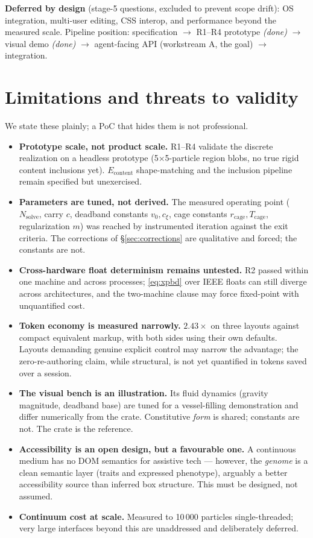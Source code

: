 \documentclass[11pt]{article}
\begin{document}
\medskip
\noindent\textbf{Deferred by design} (stage-5 questions, excluded to prevent scope drift):
OS integration, multi-user editing, CSS interop, and performance beyond the measured scale.
Pipeline position: specification $\rightarrow$ R1--R4 prototype \emph{(done)} $\rightarrow$
visual demo \emph{(done)} $\rightarrow$ agent-facing API (workstream A, the goal) $\rightarrow$
integration.

\section{Limitations and threats to validity}\label{sec:limits}

We state these plainly; a PoC that hides them is not professional.
\begin{itemize}[leftmargin=1.4em]
  \item \textbf{Prototype scale, not product scale.} R1--R4 validate the discrete realization on
  a headless prototype (5$\times$5-particle region blobs, no true rigid content inclusions yet).
  $E_{\text{content}}$ shape-matching and the inclusion pipeline remain specified but unexercised.
  \item \textbf{Parameters are tuned, not derived.} The measured operating point ($N_{\text{solve}}$,
  carry $c$, deadband constants $v_0, c_\xi$, cage constants $r_{\text{cage}}, T_{\text{cage}}$,
  regularization $m$) was reached by instrumented iteration against the exit criteria. The
  corrections of \S\ref{sec:corrections} are qualitative and forced; the constants are not.
  \item \textbf{Cross-hardware float determinism remains untested.} R2 passed within one machine
  and across processes; \eqref{eq:xpbd} over IEEE floats can still diverge across architectures,
  and the two-machine clause may force fixed-point with unquantified cost.
  \item \textbf{Token economy is measured narrowly.} $2.43\times$ on three layouts against
  compact equivalent markup, with both sides using their own defaults. Layouts demanding genuine
  explicit control may narrow the advantage; the zero-re-authoring claim, while structural, is
  not yet quantified in tokens saved over a session.
  \item \textbf{The visual bench is an illustration.} Its fluid dynamics (gravity magnitude,
  deadband base) are tuned for a vessel-filling demonstration and differ numerically from the
  crate. Constitutive \emph{form} is shared; constants are not. The crate is the reference.
  \item \textbf{Accessibility is an open design, but a favourable one.} A continuous medium has no
  DOM semantics for assistive tech --- however, the \emph{genome} is a clean semantic layer
  (traits and expressed phenotype), arguably a better accessibility source than inferred box
  structure. This must be designed, not assumed.
  \item \textbf{Continuum cost at scale.} Measured to 10\,000 particles single-threaded; very
  large interfaces beyond this are unaddressed and deliberately deferred.
\end{itemize}
\end{document}
